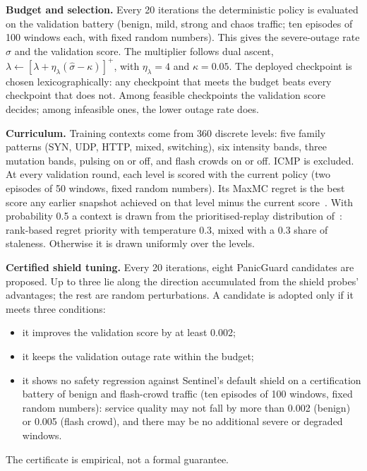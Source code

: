 \documentclass[10pt,journal,onecolumn]{IEEEtran}
\begin{document}
\textbf{Budget and selection.} Every 20 iterations the deterministic policy is evaluated on the validation battery (benign, mild, strong and chaos traffic; ten episodes of 100 windows each, with fixed random numbers). This gives the severe-outage rate $\hat\sigma$ and the validation score. The multiplier follows dual ascent, $\lambda\leftarrow[\lambda+\eta_\lambda(\hat\sigma-\kappa)]^+$, with $\eta_\lambda=4$ and $\kappa=0.05$. The deployed checkpoint is chosen lexicographically: any checkpoint that meets the budget beats every checkpoint that does not. Among feasible checkpoints the validation score decides; among infeasible ones, the lower outage rate does.

\textbf{Curriculum.} Training contexts come from 360 discrete levels: five family patterns (SYN, UDP, HTTP, mixed, switching), six intensity bands, three mutation bands, pulsing on or off, and flash crowds on or off. ICMP is excluded. At every validation round, each level is scored with the current policy (two episodes of 50 windows, fixed random numbers). Its MaxMC regret is the best score any earlier snapshot achieved on that level minus the current score~\cite{jiang2021robustplr}. With probability 0.5 a context is drawn from the prioritised-replay distribution of~\cite{jiang2021plr}: rank-based regret priority with temperature 0.3, mixed with a 0.3 share of staleness. Otherwise it is drawn uniformly over the levels.

\textbf{Certified shield tuning.} Every 20 iterations, eight PanicGuard candidates are proposed. Up to three lie along the direction accumulated from the shield probes' advantages; the rest are random perturbations. A candidate is adopted only if it meets three conditions:
\begin{itemize}
\item it improves the validation score by at least 0.002;
\item it keeps the validation outage rate within the budget;
\item it shows no safety regression against Sentinel's default shield on a certification battery of benign and flash-crowd traffic (ten episodes of 100 windows, fixed random numbers): service quality may not fall by more than 0.002 (benign) or 0.005 (flash crowd), and there may be no additional severe or degraded windows.
\end{itemize}
The certificate is empirical, not a formal guarantee.



\end{document}

